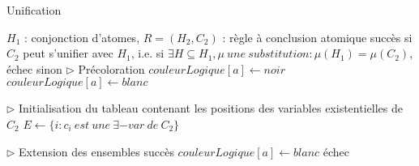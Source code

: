 \begin{center}
\begin{algorithm}[H]
\caption{Unification}\label{algo_unification}
\begin{algorithmic}[1]
\REQUIRE $H_{1}$ : conjonction d'atomes, $R = (H_{2},C_{2})$ : r\`egle \`a conclusion atomique 
\ENSURE succ\`es si $C_{2}$ peut s'unifier avec $H_{1}$, i.e. si $\exists H \subseteq H_{1}, \mu\ une\ substitution : \mu(H_{1}) = \mu(C_{2})$, \'echec sinon 
\STATE $\triangleright$ Pr\'ecoloration
		\STATE $couleurLogique[a] \leftarrow noir$
	\ELSE
		\STATE $couleurLogique[a] \leftarrow blanc$
	\ENDIF
\ENDFOR 

\STATE $\triangleright$ Initialisation du tableau contenant les positions des variables existentielles de $C_{2}$
\STATE $E \leftarrow \{i : c_{i}\ est\ une\ \exists-var\ de\ C_{2}\}$

\STATE $\triangleright$ Extension des ensembles
			\RETURN succ\`es
		\ENDIF
	\ENDIF
	\STATE $couleurLogique[a] \leftarrow blanc$
\ENDFOR
\RETURN \'echec
\end{algorithmic}
\end{algorithm}
\end{center}

